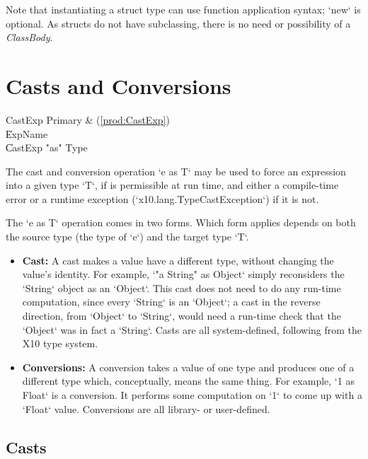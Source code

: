 Note that instantiating a struct type can use function application syntax; 
\xcd`new` is optional.  As structs do not have subclassing, there is no need or
possibility of a {\em ClassBody}.


\section{Casts and Conversions}\label{ClassCast}


\begin{bbgrammar}
             CastExp \: Primary & (\ref{prod:CastExp}) \\
                     \| ExpName \\
                     \| CastExp \xcd"as" Type \\
\end{bbgrammar}


The cast and conversion  operation \xcd`e as T` may be used to force an
expression into a given type \xcd`T`, 
if is permissible at run time, and either a compile-time error or a runtime
exception 
(\xcd`x10.lang.TypeCastException`) if it is not.  


The \xcd`e as T` operation comes in two forms.  Which form applies depends on
both the source type (the type of \xcd`e`) and the target type \xcd`T`.
\begin{itemize}
\item {\bf Cast:} A cast makes a value have a different type, without changing
      the value's identity.  For example, \xcd`"a String" as Object` simply
      reconsiders the \xcd`String` object as an \xcd`Object`.  
      This cast does not need to do any 
      run-time computation, since every \xcd`String` is an \xcd`Object`; a
      cast in the reverse direction, from \xcd`Object` to \xcd`String`, would
      need a run-time check that the \xcd`Object`
      was in fact a \xcd`String`.
      Casts are all system-defined, following from the
      X10 type system.
\item {\bf Conversions:} A conversion takes a value of one type and produces
      one of a different type which, conceptually, means the same thing.  
      For example, \xcd`1 as Float` is a conversion.  It performs some
      computation on \xcd`1`  to come up with a \xcd`Float` value.
      Conversions are all library- or user-defined.  
\end{itemize}

\subsection{Casts}

